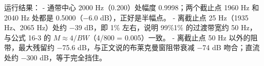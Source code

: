 \begin{Shaded}
\begin{Highlighting}[]
 \OperatorTok{(} \OperatorTok{*}\OperatorTok{)}
\OperatorTok{\{}
     \OperatorTok{(}\OperatorTok{=} \OperatorTok{;}\OperatorTok{\textless{}=}\OperatorTok{;}\OperatorTok{++)}\OperatorTok{[}\OperatorTok{]} \OperatorTok{=} \OperatorTok{{-}}\OperatorTok{[}\OperatorTok{];}
\OperatorTok{[}\OperatorTok{/} \OperatorTok{]} \OperatorTok{+=} \OperatorTok{;}
\OperatorTok{\}}

\OperatorTok{(}\OperatorTok{,}\OperatorTok{);}               
\OperatorTok{(}\OperatorTok{,}\OperatorTok{);}               
\OperatorTok{(}\OperatorTok{);}                  
     \OperatorTok{(}\OperatorTok{=} \OperatorTok{;}\OperatorTok{\textless{}=}\OperatorTok{;}\OperatorTok{++)}            
\OperatorTok{[}\OperatorTok{]} \OperatorTok{=}\OperatorTok{[}\OperatorTok{]} \OperatorTok{+}\OperatorTok{[}\OperatorTok{];}
\OperatorTok{(}\OperatorTok{);}                  
\end{Highlighting}
\end{Shaded}

运行结果： - 通带中心 2000 Hz（0.200）处幅度 0.9998；两个截止点 1960 Hz
和 2040 Hz 处都是 0.5000（−6.0 dB），正好是半幅点。 - 离截止点 25
Hz（1935 Hz、2065 Hz）处约 −39 dB，即 1\% 左右，说明 99\%1\%
的过渡带宽约 50 Hz，与公式 16-3 的 \(M \approx 4/BW\)（4/800 =
0.005）一致。 - 离截止点 50 Hz 以外的阻带，最大残留约 −75.6
dB，与正文说的布莱克曼窗阻带衰减 −74 dB 吻合；直流处约 −300
dB，等于完全挡住。


